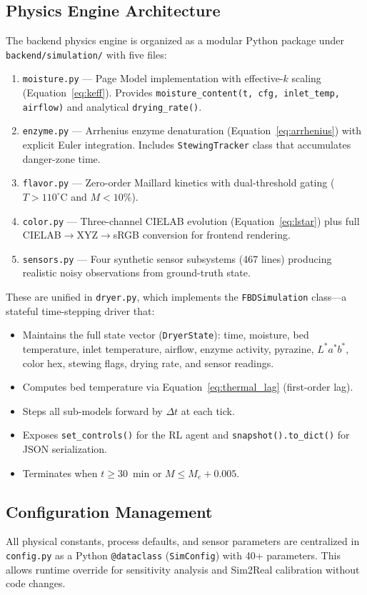 ﻿\documentclass[12pt, a4paper]{report}
\begin{document}
\subsection{Physics Engine Architecture}
The backend physics engine is organized as a modular Python package under \texttt{backend/simulation/} with five files:
\begin{enumerate}
    \item \texttt{moisture.py} --- Page Model implementation with effective-$k$ scaling (Equation~\ref{eq:keff}). Provides \texttt{moisture\_content(t, cfg, inlet\_temp, airflow)} and analytical \texttt{drying\_rate()}.
    \item \texttt{enzyme.py} --- Arrhenius enzyme denaturation (Equation~\ref{eq:arrhenius}) with explicit Euler integration. Includes \texttt{StewingTracker} class that accumulates danger-zone time.
    \item \texttt{flavor.py} --- Zero-order Maillard kinetics with dual-threshold gating ($T > 110^\circ$C and $M < 10\%$).
    \item \texttt{color.py} --- Three-channel CIELAB evolution (Equation~\ref{eq:lstar}) plus full CIELAB$\to$XYZ$\to$sRGB conversion for frontend rendering.
    \item \texttt{sensors.py} --- Four synthetic sensor subsystems (467 lines) producing realistic noisy observations from ground-truth state.
\end{enumerate}

These are unified in \texttt{dryer.py}, which implements the \texttt{FBDSimulation} class---a stateful time-stepping driver that:
\begin{itemize}
    \item Maintains the full state vector (\texttt{DryerState}): time, moisture, bed temperature, inlet temperature, airflow, enzyme activity, pyrazine, $L^*a^*b^*$, color hex, stewing flags, drying rate, and sensor readings.
    \item Computes bed temperature via Equation~\ref{eq:thermal_lag} (first-order lag).
    \item Steps all sub-models forward by $\Delta t$ at each tick.
    \item Exposes \texttt{set\_controls()} for the RL agent and \texttt{snapshot().to\_dict()} for JSON serialization.
    \item Terminates when $t \geq 30$~min or $M \leq M_e + 0.005$.
\end{itemize}

\subsection{Configuration Management}
All physical constants, process defaults, and sensor parameters are centralized in \texttt{config.py} as a Python \texttt{@dataclass} (\texttt{SimConfig}) with 40+ parameters. This allows runtime override for sensitivity analysis and Sim2Real calibration without code changes.
\end{document}
